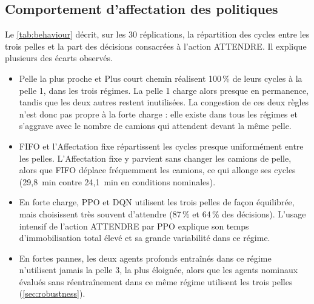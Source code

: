 \documentclass[11pt,a4paper]{article}
\newif\ifrevmarks
\newcommand{\revtag}[1]{\ifrevmarks\textsuperscript{\textcolor{red!70!black}{\scriptsize[#1]}}\fi}
\newenvironment{revbloc}[1]{\par\ifrevmarks\color{revcolor}\noindent\revtag{#1}\ \fi}{\par}
\begin{document}
\subsection{Comportement d'affectation des politiques}
\label{sec:behaviour}

\begin{revbloc}{M16, C3}
Le \cref{tab:behaviour} décrit, sur les 30 réplications, la répartition des cycles entre les trois pelles et la part des décisions consacrées à l'action ATTENDRE. Il explique plusieurs des écarts observés.

\begin{itemize}
  \item Pelle la plus proche et Plus court chemin réalisent 100\,\% de leurs cycles à la pelle 1, dans les trois régimes. La pelle 1 charge alors presque en permanence, tandis que les deux autres restent inutilisées. La congestion de ces deux règles n'est donc pas propre à la forte charge : elle existe dans tous les régimes et s'aggrave avec le nombre de camions qui attendent devant la même pelle.
  \item FIFO et l'Affectation fixe répartissent les cycles presque uniformément entre les pelles. L'Affectation fixe y parvient sans changer les camions de pelle, alors que FIFO déplace fréquemment les camions, ce qui allonge ses cycles (29,8~min contre 24,1~min en conditions nominales).
  \item En forte charge, PPO et DQN utilisent les trois pelles de façon équilibrée, mais choisissent très souvent d'attendre (87\,\% et 64\,\% des décisions). L'usage intensif de l'action ATTENDRE par PPO explique son temps d'immobilisation total élevé et sa grande variabilité dans ce régime.
  \item En fortes pannes, les deux agents profonds entraînés dans ce régime n'utilisent jamais la pelle 3, la plus éloignée, alors que les agents nominaux évalués sans réentraînement dans ce même régime utilisent les trois pelles (\cref{sec:robustness}).
\end{itemize}
\end{revbloc}
\end{document}
